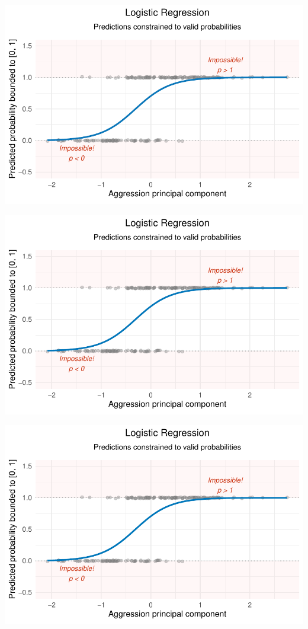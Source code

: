 \documentclass[
  letterpaper,
  DIV=11,
  numbers=noendperiod]{scrartcl}
\begin{document}
\begin{center}
\includegraphics[width=0.8\linewidth,height=\textheight,keepaspectratio]{Beyond!!!_files/figure-pdf/unnamed-chunk-4-48.pdf}
\end{center}

\begin{center}
\includegraphics[width=0.8\linewidth,height=\textheight,keepaspectratio]{Beyond!!!_files/figure-pdf/unnamed-chunk-4-49.pdf}
\end{center}

\begin{center}
\includegraphics[width=0.8\linewidth,height=\textheight,keepaspectratio]{Beyond!!!_files/figure-pdf/unnamed-chunk-4-50.pdf}
\end{center}
\end{document}
